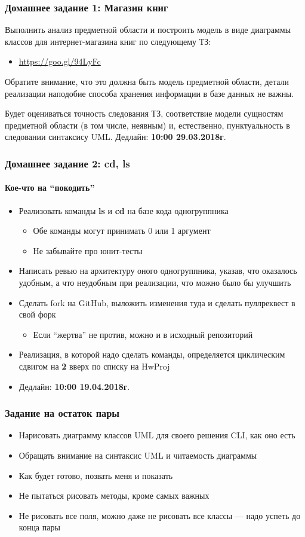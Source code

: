 \documentclass[xetex,mathserif,serif]{beamer}
\begin{document}
	\begin{frame}
		\frametitle{Домашнее задание 1: Магазин книг}
		Выполнить анализ предметной области и построить модель в виде диаграммы классов для интернет-магазина книг по следующему ТЗ:
		\begin{itemize}
			\item \url{https://goo.gl/94LyFc}
		\end{itemize}

		Обратите внимание, что это должна быть модель предметной области, детали реализации наподобие способа хранения информации в базе данных не важны.

		Будет оцениваться точность следования ТЗ, соответствие модели сущностям предметной области (в том числе, неявным) и, естественно, пунктуальность в следовании синтаксису UML.
		\bigskip
		Дедлайн: \textbf{10:00 29.03.2018г}.
	\end{frame}

	\begin{frame}
		\frametitle{Домашнее задание 2: cd, ls}
		\framesubtitle{Кое-что на ``покодить''}
		\begin{itemize}
			\item Реализовать команды \textbf{ls} и \textbf{cd} на базе кода одногруппника
			\begin{itemize}
				\item Обе команды могут принимать 0 или 1 аргумент
				\item Не забывайте про юнит-тесты
			\end{itemize}
			\item Написать ревью на архитектуру оного одногруппника, указав, что оказалось удобным, а что неудобным при реализации, что можно было бы улучшить
			\item Сделать fork на GitHub, выложить изменения туда и сделать пуллреквест в свой форк
			\begin{itemize}
				\item Если ``жертва'' не против, можно и в исходный репозиторий
			\end{itemize}
			\item Реализация, в которой надо сделать команды, определяется циклическим сдвигом на \textbf{2} вверх по списку на HwProj
			\item Дедлайн: \textbf{10:00 19.04.2018г}.
		\end{itemize}
	\end{frame}

	\begin{frame}
		\frametitle{Задание на остаток пары}
		\begin{itemize}
			\item Нарисовать диаграмму классов UML для своего решения CLI, как оно есть
			\item Обращать внимание на синтаксис UML и читаемость диаграммы
			\item Как будет готово, позвать меня и показать
			\item Не пытаться рисовать методы, кроме самых важных
			\item Не рисовать все поля, можно даже не рисовать все классы --- надо успеть до конца пары
		\end{itemize}
	\end{frame}
\end{document}
